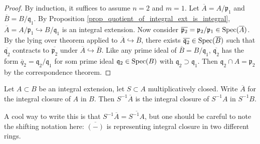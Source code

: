 \documentclass[12pt]{article}
\begin{document}
\begin{proof}
	By induction, it suffices to assume $n=2$ and $m=1$. Let $\overline{A}=A/\mathfrak{p}_1$ and $\overline{B}=B/\mathfrak{q}_1$. By Proposition \ref{prop_quotient_of_integral_ext_is_integral}, $\overline{A}=A/\mathfrak{p}_1\hookrightarrow B/\mathfrak{q}_1$ is an integral extension. Now consider $\overline{\mathfrak{p}_2}=\mathfrak{p}_2/\mathfrak{p}_1\in \text{Spec}(\overline{A})$. By the lying over theorem applied to $\overline{A}\hookrightarrow\overline{B}$, there exists $\overline{\mathfrak{q}_2}\in\text{Spec}(\overline{B})$ such that $\overline{\mathfrak{q}_2}$ contracts to $\overline{\mathfrak{p}_2}$ under $\overline{A}\hookrightarrow\overline{B}$. Like any prime ideal of $\overline{B}=B/\mathfrak{q}_1$, $\overline{\mathfrak{q}_2}$ has the form $\overline{q}_2=\mathfrak{q}_2/\mathfrak{q}_1$ for som prime ideal $\mathfrak{q}_2\in\text{Spec}(B)$ with $\mathfrak{q}_2\supset\mathfrak{q}_1$. Then $\mathfrak{q}_2\cap A=\mathfrak{p}_2$ by the correspondence theorem.
\end{proof}

\begin{proposition}
\label{prop_localization_of_integral_closure_is_integral_closure_of_localization}
	Let $A\subset B$ be an integral extension, let $S\subset A$ multiplicatively closed. Write $\overline{A}$ for the integral closure of $A$ in $B$. Then $S^{-1}\overline{A}$ is the integral closure of $S^{-1}A$ in $S^{-1}B$.
\end{proposition}

\begin{remark}
	A cool way to write this is that $S^{-1}\overline{A}=\overline{S^{-1}A}$, but one should be careful to note the shifting notation here: $\overline{(-)}$ is representing integral closure in two different rings.
\end{remark}
\end{document}
